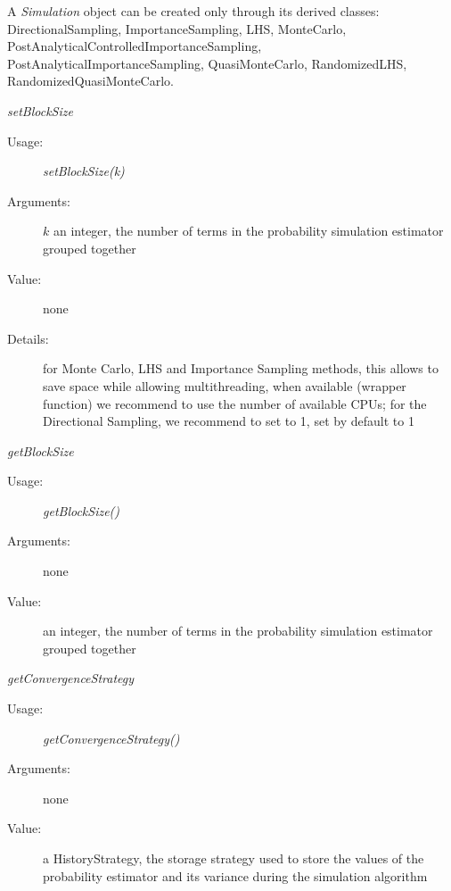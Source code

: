 \begin{description}
\item[Usage:] A \textit{Simulation} object can be created only through its derived classes:  DirectionalSampling, ImportanceSampling, LHS, MonteCarlo, PostAnalyticalControlledImportanceSampling, PostAnalyticalImportanceSampling, QuasiMonteCarlo, RandomizedLHS, RandomizedQuasiMonteCarlo.

\item[Some methods :]  \rule{0pt}{1em}

\begin{description}

\item \textit{setBlockSize}
\begin{description}
\item[Usage:] \textit{setBlockSize(k)}
\item[Arguments:] $k$ an integer, the number of terms in the probability simulation estimator grouped together
\item[Value:] none
\item[Details:] for Monte Carlo, LHS and Importance Sampling methods, this allows to save space while allowing multithreading, when available (wrapper function) we recommend to use the number of available CPUs; for the Directional Sampling, we recommend to set to 1, set by default to 1
\end{description}
\bigskip

\item \textit{getBlockSize}
\begin{description}
\item[Usage:] \textit{getBlockSize()}
\item[Arguments:] none
\item[Value:]  an integer, the number of terms in the probability simulation estimator grouped together
\end{description}
\bigskip

\item \textit{getConvergenceStrategy}
\begin{description}
\item[Usage:] \textit{getConvergenceStrategy()}
\item[Arguments:] none
\item[Value:]  a HistoryStrategy, the storage strategy used to store the values of the probability estimator and its variance
during the simulation algorithm
\end{description}
\bigskip


\end{description}
\end{description}

